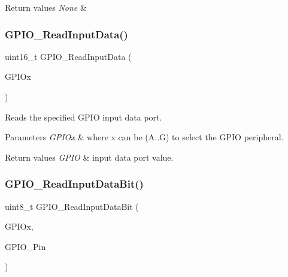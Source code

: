 \begin{DoxyRetVals}{Return values}
{\em None} & \\
\hline
\end{DoxyRetVals}
\mbox{\label{group___g_p_i_o___private___functions_ga139a33adc8409288e9f193bbebb5a0f7}} 
\subsubsection{\texorpdfstring{GPIO\_ReadInputData()}{GPIO\_ReadInputData()}}
{\footnotesize\ttfamily uint16\+\_\+t G\+P\+I\+O\+\_\+\+Read\+Input\+Data (\begin{DoxyParamCaption}\item[{\mbox{\hyperlink{struct_g_p_i_o___type_def}{G\+P\+I\+O\+\_\+\+Type\+Def}} $\ast$}]{G\+P\+I\+Ox }\end{DoxyParamCaption})}



Reads the specified G\+P\+IO input data port. 


\begin{DoxyParams}{Parameters}
{\em G\+P\+I\+Ox} & where x can be (A..G) to select the G\+P\+IO peripheral. \\
\hline
\end{DoxyParams}

\begin{DoxyRetVals}{Return values}
{\em G\+P\+IO} & input data port value. \\
\hline
\end{DoxyRetVals}
\mbox{\label{group___g_p_i_o___private___functions_ga98772ef6b639b3fa06c8ae5ba28d3aaa}} 
\subsubsection{\texorpdfstring{GPIO\_ReadInputDataBit()}{GPIO\_ReadInputDataBit()}}
{\footnotesize\ttfamily uint8\+\_\+t G\+P\+I\+O\+\_\+\+Read\+Input\+Data\+Bit (\begin{DoxyParamCaption}\item[{\mbox{\hyperlink{struct_g_p_i_o___type_def}{G\+P\+I\+O\+\_\+\+Type\+Def}} $\ast$}]{G\+P\+I\+Ox,  }\item[{uint16\+\_\+t}]{G\+P\+I\+O\+\_\+\+Pin }\end{DoxyParamCaption})}



